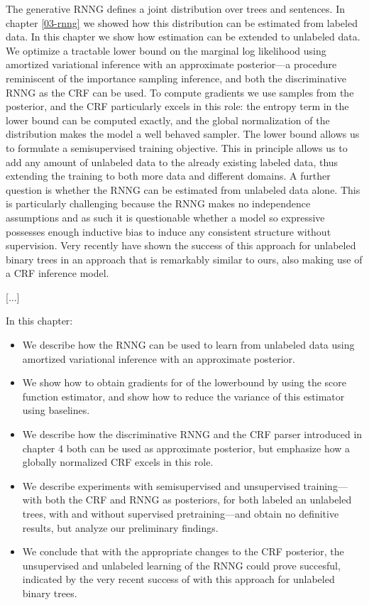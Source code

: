 The generative RNNG defines a joint distribution over trees and sentences. In chapter \ref{03-rnng} we showed how this distribution can be estimated from labeled data. In this chapter we show how estimation can be extended to unlabeled data. We optimize a tractable lower bound on the marginal log likelihood using amortized variational inference with an approximate posterior---a procedure reminiscent of the importance sampling inference, and both the discriminative RNNG as the CRF can be used. To compute gradients we use samples from the posterior, and the CRF particularly excels in this role: the entropy term in the lower bound can be computed exactly, and the global normalization of the distribution makes the model a well behaved sampler. The lower bound allows us to formulate a semisupervised training objective. This in principle allows us to add any amount of unlabeled data to the already existing labeled data, thus extending the training to both more data and different domains. A further question is whether the RNNG can be estimated from unlabeled data alone. This is particularly challenging because the RNNG makes no independence assumptions and as such it is questionable whether a model so expressive possesses enough inductive bias to induce any consistent structure without supervision. Very recently \citep{kim2019unsupervised} have shown the success of this approach for unlabeled binary trees in an approach that is remarkably similar to ours, also making use of a CRF inference model.

[...]

In this chapter:
\begin{itemize}
  \item We describe how the RNNG can be used to learn from unlabeled data using amortized variational inference with an approximate posterior.
  \item We show how to obtain gradients for of the lowerbound by using the score function estimator, and show how to reduce the variance of this estimator using baselines.
  \item We describe how the discriminative RNNG and the CRF parser introduced in chapter 4 both can be used as approximate posterior, but emphasize how a globally normalized CRF excels in this role.
  \item We describe experiments with semisupervised and unsupervised training---with both the CRF and RNNG as posteriors, for both labeled an unlabeled trees, with and without supervised pretraining---and obtain no definitive results, but analyze our preliminary findings.
  \item We conclude that with the appropriate changes to the CRF posterior, the unsupervised and unlabeled learning of the RNNG could prove succesful, indicated by the very recent success of \citet{kim2019unsupervised} with this approach for unlabeled binary trees.
\end{itemize}

